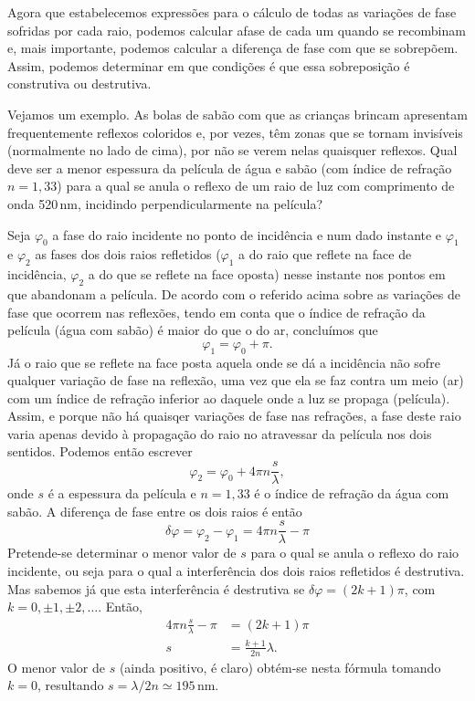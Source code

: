 Agora que estabelecemos expressões para o cálculo de todas as variações de fase
sofridas por cada raio, podemos calcular afase de cada um quando se recombinam
e, mais importante, podemos calcular a diferença de fase com que se sobrepõem.
Assim, podemos determinar em que condições é que essa sobreposição é construtiva
ou destrutiva.

Vejamos um exemplo. As bolas de sabão com que as crianças brincam apresentam
frequentemente reflexos coloridos e, por vezes, têm zonas que se tornam
invisíveis (normalmente no lado de cima), por não se verem nelas quaisquer
reflexos. Qual deve ser a menor espessura da película de água e sabão (com
índice de refração $n=1,33$) para a qual se anula o reflexo de um raio de luz
com comprimento de onda 520\,nm, incidindo perpendicularmente na película?

Seja $\varphi_0$ a fase do raio incidente no ponto de incidência e num dado
instante e $\varphi_1$ e $\varphi_2$ as fases dos dois raios refletidos
($\varphi_1$ a do raio que reflete na face de incidência, $\varphi_2$ a do que
se reflete na face oposta) nesse instante nos pontos em que abandonam a
película. De acordo com o referido acima sobre as variações de fase que ocorrem
nas reflexões, tendo em conta que o índice de refração da película (água com
sabão) é maior do que o do ar, concluímos que 
\begin{equation*}
\varphi_1=\varphi_0+\pi.
\end{equation*}
Já o raio que se reflete na face posta aquela onde se dá a incidência não sofre
qualquer variação de fase na reflexão, uma vez que ela se faz contra um meio
(ar) com um índice de refração inferior ao daquele onde a luz se propaga
(película). Assim, e porque não há quaisqer variações de fase nas refrações, a
fase deste raio varia apenas devido à propagação do raio no atravessar da
película nos dois sentidos. Podemos então escrever
\begin{equation*}
\varphi_2= \varphi_0+4\pi n\frac{s}{\lambda},
\end{equation*}
onde $s$ é a espessura da película e $n=1,33$ é o índice de refração da água com
sabão. A diferença de fase entre os dois raios é então
\begin{equation*}
\delta\varphi = \varphi_2-\varphi_1=4\pi n\frac{s}{\lambda}-\pi
\end{equation*}
Pretende-se determinar o menor valor de $s$ para o qual se anula o reflexo do
raio incidente, ou seja para o qual a interferência dos dois raios refletidos é
destrutiva. Mas sabemos já que esta interferência é destrutiva se
$\delta\varphi=(2k+1)\pi$, com $k=0,\pm1,\pm2,\ldots$. Então,
\begin{align*}
4\pi n\frac{s}{\lambda}-\pi&=(2k+1)\pi\\
s&=\frac{k+1}{2n}\lambda.
\end{align*}
O menor valor de $s$ (ainda positivo, é claro) obtém-se nesta fórmula tomando
$k=0$, resultando $s=\lambda/2n\simeq 195$\,nm.

